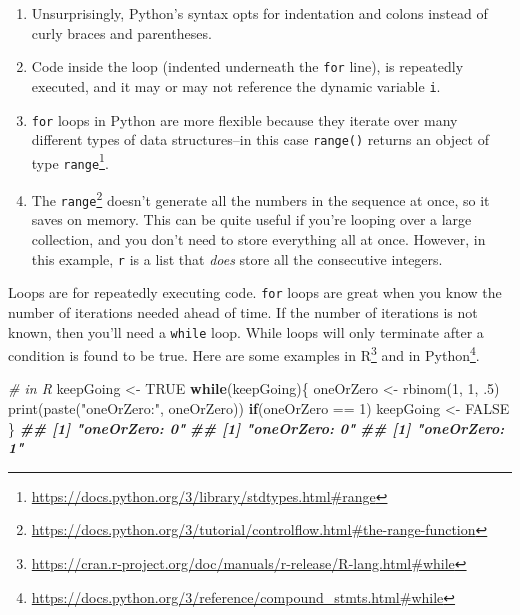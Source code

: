 \documentclass[
  12pt,
  krantz2]{krantz}
\makeatletter
\newenvironment{Shaded}{\begin{snugshade}}{\end{snugshade}}
\newcommand{\CommentTok}[1]{\textcolor[rgb]{0.37,0.37,0.37}{\textit{#1}}}
\newcommand{\ConstantTok}[1]{\textcolor[rgb]{0,0,0}{#1}}
\newcommand{\ControlFlowTok}[1]{\textcolor[rgb]{0.27,0.27,0.27}{\textbf{#1}}}
\newcommand{\DecValTok}[1]{\textcolor[rgb]{0.06,0.06,0.06}{#1}}
\newcommand{\DocumentationTok}[1]{\textcolor[rgb]{0.37,0.37,0.37}{\textbf{\textit{#1}}}}
\newcommand{\FunctionTok}[1]{\textcolor[rgb]{0,0,0}{#1}}
\newcommand{\NormalTok}[1]{#1}
\newcommand{\OtherTok}[1]{\textcolor[rgb]{0.37,0.37,0.37}{#1}}
\newcommand{\SpecialCharTok}[1]{\textcolor[rgb]{0,0,0}{#1}}
\newcommand{\StringTok}[1]{\textcolor[rgb]{0.5,0.5,0.5}{#1}}
\providecommand{\tightlist}{%
  \setlength{\itemsep}{0pt}\setlength{\parskip}{0pt}}
\renewcommand{\href}[2]{#2\footnote{\url{#1}}}
\newenvironment{kframe}{%
\medskip{}
\setlength{\fboxsep}{.8em}
 \def\at@end@of@kframe{}%
 \ifinner\ifhmode%
  \def\at@end@of@kframe{\end{minipage}}%
  \begin{minipage}{\columnwidth}%
 \fi\fi%
 \def\FrameCommand##1{\hskip\@totalleftmargin \hskip-\fboxsep
 \colorbox{shadecolor}{##1}\hskip-\fboxsep
     \hskip-\linewidth \hskip-\@totalleftmargin \hskip\columnwidth}%
 \MakeFramed {\advance\hsize-\width
   \@totalleftmargin\z@ \linewidth\hsize
   \@setminipage}}%
 {\par\unskip\endMakeFramed%
 \at@end@of@kframe}
\renewenvironment{Shaded}{\begin{kframe}}{\end{kframe}}
\makeatother
\begin{document}
\begin{enumerate}
\def\labelenumi{\arabic{enumi}.}
\tightlist
\item
  Unsurprisingly, Python's syntax opts for indentation and colons instead of curly braces and parentheses.
\item
  Code inside the loop (indented underneath the \texttt{for} line), is repeatedly executed, and it may or may not reference the dynamic variable \texttt{i}.
\item
  \texttt{for} loops in Python are more flexible because they iterate over many different types of data structures--in this case \href{https://docs.python.org/3/library/stdtypes.html\#range}{\texttt{range()} returns an object of type \texttt{range}}.
\item
  The \href{https://docs.python.org/3/tutorial/controlflow.html\#the-range-function}{\texttt{range}} doesn't generate all the numbers in the sequence at once, so it saves on memory. This can be quite useful if you're looping over a large collection, and you don't need to store everything all at once. However, in this example, \texttt{r} is a list that \emph{does} store all the consecutive integers.
\end{enumerate}

Loops are for repeatedly executing code. \texttt{for} loops are great when you know the number of iterations needed ahead of time. If the number of iterations is not known, then you'll need a \texttt{while} loop. While loops will only terminate after a condition is found to be true. Here are some examples \href{https://cran.r-project.org/doc/manuals/r-release/R-lang.html\#while}{in R} and \href{https://docs.python.org/3/reference/compound_stmts.html\#while}{in Python}.

\begin{Shaded}
\begin{Highlighting}[]
\CommentTok{\# in R}
\NormalTok{keepGoing }\OtherTok{\textless{}{-}} \ConstantTok{TRUE}
\ControlFlowTok{while}\NormalTok{(keepGoing)\{}
\NormalTok{  oneOrZero }\OtherTok{\textless{}{-}} \FunctionTok{rbinom}\NormalTok{(}\DecValTok{1}\NormalTok{, }\DecValTok{1}\NormalTok{, .}\DecValTok{5}\NormalTok{)}
  \FunctionTok{print}\NormalTok{(}\FunctionTok{paste}\NormalTok{(}\StringTok{"oneOrZero:"}\NormalTok{, oneOrZero))}
  \ControlFlowTok{if}\NormalTok{(oneOrZero }\SpecialCharTok{==} \DecValTok{1}\NormalTok{)}
\NormalTok{    keepGoing }\OtherTok{\textless{}{-}} \ConstantTok{FALSE}
\NormalTok{\}}
\DocumentationTok{\#\# [1] "oneOrZero: 0"}
\DocumentationTok{\#\# [1] "oneOrZero: 0"}
\DocumentationTok{\#\# [1] "oneOrZero: 1"}
\end{Highlighting}
\end{Shaded}
\end{document}
